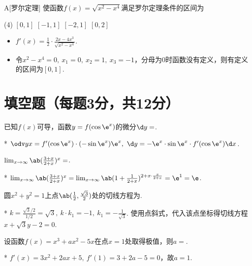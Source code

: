 \begin{choice}{A}[罗尔定理]
    使函数$f(x)=\sqrt{x^2-x^4}$满足罗尔定理条件的区间为
\begin{tasks}(4)
    \task $[0,1]$
    \task $[-1,1]$
    \task $[-2,1]$
    \task $[0,2]$
\end{tasks}
\end{choice}
\begin{solution}
\begin{itemize}
    \item $f'(x)=\frac12\cdot\frac{2x-4x^3}{\sqrt{x^2-x^4}}$.
    \item 令$x^2-x^4=0,\ x_1=0,\ x_2=1,\ x_3=-1$，分母为$0$时函数没有定义，则有定义的区间为$[0,1]$.
\end{itemize}
\end{solution}

\section{填空题（每题3分，共12分）}
\begin{problem}[函数的微分]
    已知$f(x)$可导，函数$y=f(\cos\e^x)$的微分$\d y=$.
\end{problem}
\begin{solution}*
    $\odv yx=f'(\cos\e^x)\cdot(-\sin\e^x)\e^x,\ \d y=-\e^x\cdot\sin\e^x\cdot f'(\cos\e^x)\d x$.
\end{solution}

\begin{problem}[第二个重要极限]
    $\lim_{x\to\infty}\ab(\frac{3+x}{2+x})^x=$\ans{$\e$}.
\end{problem}
\begin{solution}*
    $\lim_{x\to\infty}\ab(\frac{3+x}{2+x})^x=\lim_{x\to\infty}\ab(1+\frac{1}{2+x})^{2+x\cdot\frac{x}{2+x}}=\e^1=\e$.
\end{solution}

\begin{problem}[导数的概念]
    圆$x^2+y^2=1$上点$\ab(\frac12,\frac{\sqrt{3}}{2})$处的切线方程为.
\end{problem}
\begin{solution}*
    $k=\frac{\sqrt3/2}{1/2}=\sqrt{3},\ k\cdot k_1=-1,\ k_1=-\frac{1}{\sqrt{3}}$. 使用点斜式，代入该点坐标得切线方程$x+\sqrt3y-2=0$.
\end{solution}

\begin{problem}[函数的单调性与极值]
    设函数$f(x)=x^3+ax^2-5x$在点$x=1$处取得极值，则$a=$.
\end{problem}
\begin{solution}*
    $f'(x)=3x^2+2ax+5,\ f'(1)=3+2a-5=0$，故$a=1$.
\end{solution}

